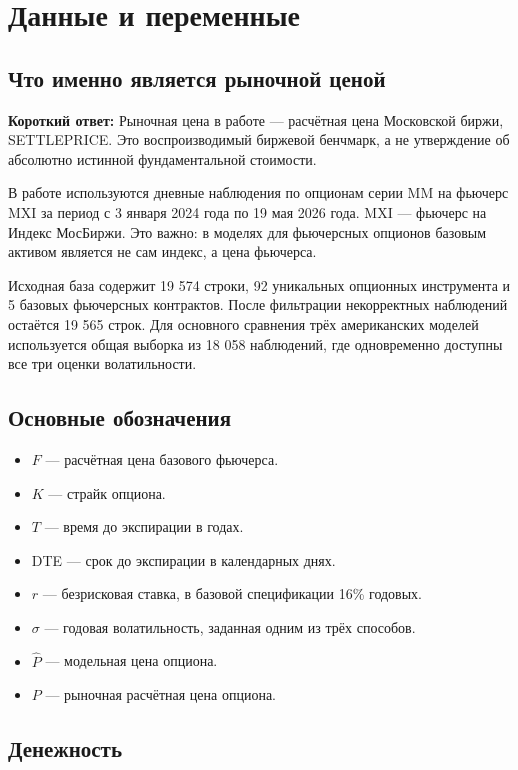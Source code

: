 \documentclass[11pt,a4paper]{article}
\newcommand{\answerbox}[1]{%
  \noindent\colorbox{softblue}{%
    \parbox{\dimexpr\linewidth-2\fboxsep\relax}{\textbf{Короткий ответ:} #1}%
  }\par\vspace{0.2em}
}
\begin{document}
\section{Данные и переменные}

\subsection{Что именно является рыночной ценой}

\answerbox{Рыночная цена в работе --- расчётная цена Московской биржи, SETTLEPRICE. Это воспроизводимый биржевой бенчмарк, а не утверждение об абсолютно истинной фундаментальной стоимости.}

В работе используются дневные наблюдения по опционам серии MM на фьючерс MXI за период с 3 января 2024 года по 19 мая 2026 года. MXI --- фьючерс на Индекс МосБиржи. Это важно: в моделях для фьючерсных опционов базовым активом является не сам индекс, а цена фьючерса.

Исходная база содержит 19 574 строки, 92 уникальных опционных инструмента и 5 базовых фьючерсных контрактов. После фильтрации некорректных наблюдений остаётся 19 565 строк. Для основного сравнения трёх американских моделей используется общая выборка из 18 058 наблюдений, где одновременно доступны все три оценки волатильности.

\subsection{Основные обозначения}

\begin{itemize}
    \item $F$ --- расчётная цена базового фьючерса.
    \item $K$ --- страйк опциона.
    \item $T$ --- время до экспирации в годах.
    \item DTE --- срок до экспирации в календарных днях.
    \item $r$ --- безрисковая ставка, в базовой спецификации 16\% годовых.
    \item $\sigma$ --- годовая волатильность, заданная одним из трёх способов.
    \item $\widehat{P}$ --- модельная цена опциона.
    \item $P$ --- рыночная расчётная цена опциона.
\end{itemize}

\subsection{Денежность}
\end{document}
